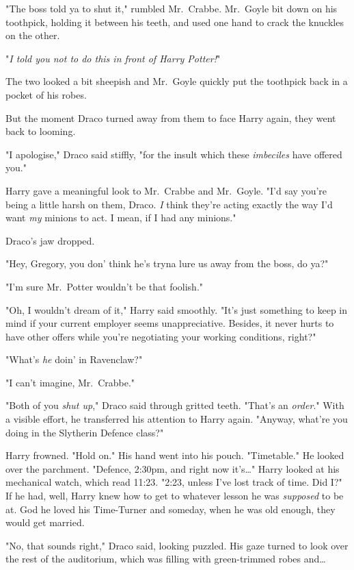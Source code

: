 "The boss told ya to shut it," rumbled Mr.~Crabbe. Mr.~Goyle bit down on his 
toothpick, holding it between his teeth, and used one hand to crack the 
knuckles on the other.

"\emph{I told you not to do this in front of Harry Potter!}"

The two looked a bit sheepish and Mr.~Goyle quickly put the toothpick back in a 
pocket of his robes.

But the moment Draco turned away from them to face Harry again, they went back 
to looming.

"I apologise," Draco said stiffly, "for the insult which these \emph{imbeciles} 
have offered you."

Harry gave a meaningful look to Mr.~Crabbe and Mr.~Goyle. "I'd say you're being 
a little harsh on them, Draco. \emph{I} think they're acting exactly the way 
I'd want \emph{my} minions to act. I mean, if I had any minions."

Draco's jaw dropped.

"Hey, Gregory, you don' think he's tryna lure us away from the boss, do ya?"

"I'm sure Mr.~Potter wouldn't be that foolish."

"Oh, I wouldn't dream of it," Harry said smoothly. "It's just something to keep 
in mind if your current employer seems unappreciative. Besides, it never hurts 
to have other offers while you're negotiating your working conditions, right?"

"What's \emph{he} doin' in Ravenclaw?"

"I can't imagine, Mr.~Crabbe."

"Both of you \emph{shut up}," Draco said through gritted teeth. "That's an 
\emph{order}." With a visible effort, he transferred his attention to Harry 
again. "Anyway, what're you doing in the Slytherin Defence class?"

Harry frowned. "Hold on." His hand went into his pouch. "Timetable." He looked 
over the parchment. "Defence, 2:30pm, and right now it's{\ldots}" Harry looked 
at his mechanical watch, which read 11:23. "2:23, unless I've lost track of 
time. Did I?" If he had, well, Harry knew how to get to whatever lesson he was 
\emph{supposed} to be at. God he loved his Time-Turner and someday, when he was 
old enough, they would get married.

"No, that sounds right," Draco said, looking puzzled. His gaze turned to look 
over the rest of the auditorium, which was filling with green-trimmed robes 
and{\ldots}

